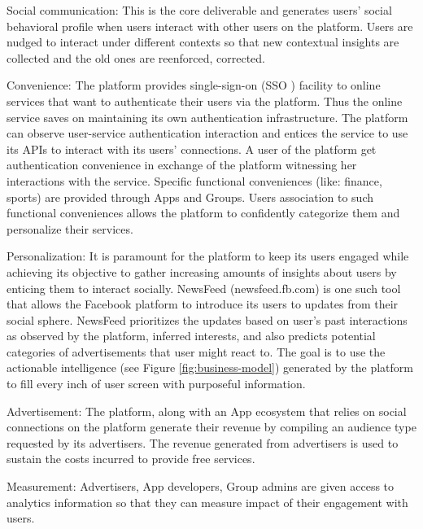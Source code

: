 \documentclass[a4paper,twoside]{article}
\begin{document}
\begin{description}
\item{Social communication:} This is the core deliverable and
  generates users' social behavioral profile when users interact with
  other users on the platform. Users are nudged to interact under
  different contexts so that new contextual insights are collected and
  the old ones are reenforced, corrected.
\item{Convenience:} The platform provides single-sign-on (SSO
  \cite{sso1,sso2}) facility to online services that want to
  authenticate their users via the platform. Thus the online service
  saves on maintaining its own authentication infrastructure. The
  platform can observe user-service authentication interaction and
  entices the service to use its APIs to interact with its users'
  connections. A user of the platform get authentication convenience
  in exchange of the platform witnessing her interactions with the
  service. Specific functional conveniences (like: finance, sports)
  are provided through Apps and Groups. Users association to such
  functional conveniences allows the platform to confidently
  categorize them and personalize their services.
\item{Personalization:} It is paramount for the platform to keep its
  users engaged while achieving its objective to gather increasing
  amounts of insights about users by enticing them to interact
  socially. NewsFeed (newsfeed.fb.com) is one such tool that
  allows the Facebook platform to introduce its users to updates from
  their social sphere. NewsFeed prioritizes the updates based on
  user's past interactions as observed by the platform, inferred
  interests, and also predicts potential categories of advertisements
  that user might react to. The goal is to use the actionable
  intelligence (see Figure \ref{fig:business-model}) generated by the
  platform to fill every inch of user screen with purposeful
  information.
\item{Advertisement:} The platform, along with an App ecosystem that
  relies on social connections on the platform generate their revenue
  by compiling an audience type requested by its advertisers. The
  revenue generated from advertisers is used to sustain the costs
  incurred to provide free services.
\item{Measurement:} Advertisers, App developers, Group admins are
  given access to analytics information so that they can measure
  impact of their engagement with users.
\end{description}
\end{document}

